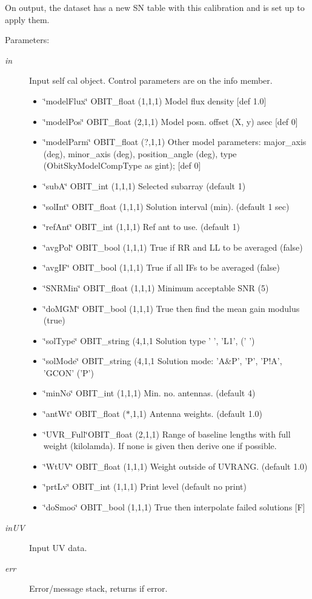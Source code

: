 On output, the dataset has a new SN table with this calibration and is set up to apply them. \begin{Desc}
\item[Parameters:]
\begin{description}
\item[{\em in}]Input self cal object. Control parameters are on the info member. \begin{itemize}
\item \char`\"{}model\-Flux\char`\"{} OBIT\_\-float (1,1,1) Model flux density [def 1.0] \item \char`\"{}model\-Pos\char`\"{} OBIT\_\-float (2,1,1) Model posn. offset (X, y) asec [def 0] \item \char`\"{}model\-Parm\char`\"{} OBIT\_\-float (?,1,1) Other model parameters: major\_\-axis (deg), minor\_\-axis (deg), position\_\-angle (deg), type (Obit\-Sky\-Model\-Comp\-Type as gint); [def 0] \item \char`\"{}sub\-A\char`\"{} OBIT\_\-int (1,1,1) Selected subarray (default 1) \item \char`\"{}sol\-Int\char`\"{} OBIT\_\-float (1,1,1) Solution interval (min). (default 1 sec) \item \char`\"{}ref\-Ant\char`\"{} OBIT\_\-int (1,1,1) Ref ant to use. (default 1) \item \char`\"{}avg\-Pol\char`\"{} OBIT\_\-bool (1,1,1) True if RR and LL to be averaged (false) \item \char`\"{}avg\-IF\char`\"{} OBIT\_\-bool (1,1,1) True if all IFs to be averaged (false) \item \char`\"{}SNRMin\char`\"{} OBIT\_\-float (1,1,1) Minimum acceptable SNR (5) \item \char`\"{}do\-MGM\char`\"{} OBIT\_\-bool (1,1,1) True then find the mean gain modulus (true) \item \char`\"{}sol\-Type\char`\"{} OBIT\_\-string (4,1,1 Solution type ' ', 'L1', (' ') \item \char`\"{}sol\-Mode\char`\"{} OBIT\_\-string (4,1,1 Solution mode: 'A\&P', 'P', 'P!A', 'GCON' ('P') \item \char`\"{}min\-No\char`\"{} OBIT\_\-int (1,1,1) Min. no. antennas. (default 4) \item \char`\"{}ant\-Wt\char`\"{} OBIT\_\-float ($\ast$,1,1) Antenna weights. (default 1.0) \item \char`\"{}UVR\_\-Full\char`\"{}OBIT\_\-float (2,1,1) Range of baseline lengths with full weight (kilolamda). If none is given then derive one if possible. \item \char`\"{}Wt\-UV\char`\"{} OBIT\_\-float (1,1,1) Weight outside of UVRANG. (default 1.0) \item \char`\"{}prt\-Lv\char`\"{} OBIT\_\-int (1,1,1) Print level (default no print) \item \char`\"{}do\-Smoo\char`\"{} OBIT\_\-bool (1,1,1) True then interpolate failed solutions [F] \end{itemize}
\item[{\em in\-UV}]Input UV data. \item[{\em err}]Error/message stack, returns if error. \end{description}
\end{Desc}
